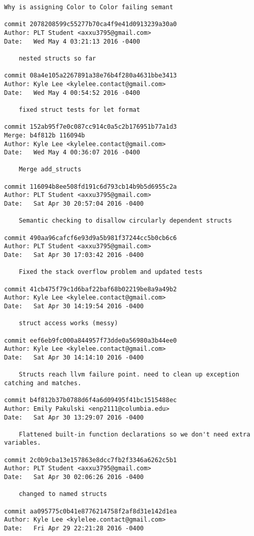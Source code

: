 \begin{lstlisting}[backgroundcolor=\color{white}]
    Why is assigning Color to Color failing semant

commit 2078208599c55277b70ca4f9e41d0913239a30a0
Author: PLT Student <axxu3795@gmail.com>
Date:   Wed May 4 03:21:13 2016 -0400

    nested structs so far

commit 08a4e105a2267891a38e76b4f280a4631bbe3413
Author: Kyle Lee <kylelee.contact@gmail.com>
Date:   Wed May 4 00:54:52 2016 -0400

    fixed struct tests for let format

commit 152ab95f7e0c087cc914c0a5c2b176951b77a1d3
Merge: b4f812b 116094b
Author: Kyle Lee <kylelee.contact@gmail.com>
Date:   Wed May 4 00:36:07 2016 -0400

    Merge add_structs

commit 116094b8ee508fd191c6d793cb14b9b5d6955c2a
Author: PLT Student <axxu3795@gmail.com>
Date:   Sat Apr 30 20:57:04 2016 -0400

    Semantic checking to disallow circularly dependent structs

commit 490aa96cafcf6e93d9a5b981f37244cc5b0cb6c6
Author: PLT Student <axxu3795@gmail.com>
Date:   Sat Apr 30 17:03:42 2016 -0400

    Fixed the stack overflow problem and updated tests

commit 41cb475f79c1d6baf22baf68b02219be8a9a49b2
Author: Kyle Lee <kylelee.contact@gmail.com>
Date:   Sat Apr 30 14:19:54 2016 -0400

    struct access works (messy)

commit eef6eb9fc000a844957f73dde0a56980a3b44ee0
Author: Kyle Lee <kylelee.contact@gmail.com>
Date:   Sat Apr 30 14:14:10 2016 -0400

    Structs reach llvm failure point. need to clean up exception catching and matches.

commit b4f812b37b0788d6f4a6d09495f41bc1515488ec
Author: Emily Pakulski <enp2111@columbia.edu>
Date:   Sat Apr 30 13:29:07 2016 -0400

    Flattened built-in function declarations so we don't need extra variables.

commit 2c0b9cba13e157863e8dcc7fb2f3346a6262c5b1
Author: PLT Student <axxu3795@gmail.com>
Date:   Sat Apr 30 02:06:26 2016 -0400

    changed to named structs

commit aa095775c0b41e8776214758f2af8d31e142d1ea
Author: Kyle Lee <kylelee.contact@gmail.com>
Date:   Fri Apr 29 22:21:28 2016 -0400


\end{lstlisting}
